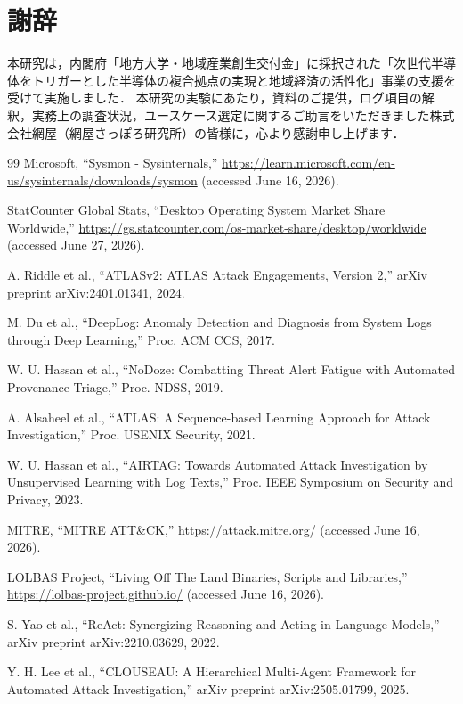 \documentclass[a4paper,twocolumn,10pt]{article}
\begin{document}
\section*{謝辞}

本研究は，内閣府「地方大学・地域産業創生交付金」に採択された「次世代半導体をトリガーとした半導体の複合拠点の実現と地域経済の活性化」事業の支援を受けて実施しました．
本研究の実験にあたり，資料のご提供，ログ項目の解釈，実務上の調査状況，ユースケース選定に関するご助言をいただきました株式会社網屋（網屋さっぽろ研究所）の皆様に，心より感謝申し上げます．

\begin{thebibliography}{99}
Microsoft, ``Sysmon - Sysinternals,'' \url{https://learn.microsoft.com/en-us/sysinternals/downloads/sysmon} (accessed June 16, 2026).

StatCounter Global Stats, ``Desktop Operating System Market Share Worldwide,'' \url{https://gs.statcounter.com/os-market-share/desktop/worldwide} (accessed June 27, 2026).

A. Riddle et al., ``ATLASv2: ATLAS Attack Engagements, Version 2,'' arXiv preprint arXiv:2401.01341, 2024.

M. Du et al., ``DeepLog: Anomaly Detection and Diagnosis from System Logs through Deep Learning,'' Proc. ACM CCS, 2017.

W. U. Hassan et al., ``NoDoze: Combatting Threat Alert Fatigue with Automated Provenance Triage,'' Proc. NDSS, 2019.

A. Alsaheel et al., ``ATLAS: A Sequence-based Learning Approach for Attack Investigation,'' Proc. USENIX Security, 2021.

W. U. Hassan et al., ``AIRTAG: Towards Automated Attack Investigation by Unsupervised Learning with Log Texts,'' Proc. IEEE Symposium on Security and Privacy, 2023.

MITRE, ``MITRE ATT\&CK,'' \url{https://attack.mitre.org/} (accessed June 16, 2026).

LOLBAS Project, ``Living Off The Land Binaries, Scripts and Libraries,'' \url{https://lolbas-project.github.io/} (accessed June 16, 2026).

S. Yao et al., ``ReAct: Synergizing Reasoning and Acting in Language Models,'' arXiv preprint arXiv:2210.03629, 2022.

Y. H. Lee et al., ``CLOUSEAU: A Hierarchical Multi-Agent Framework for Automated Attack Investigation,'' arXiv preprint arXiv:2505.01799, 2025.
\end{thebibliography}
\end{document}
